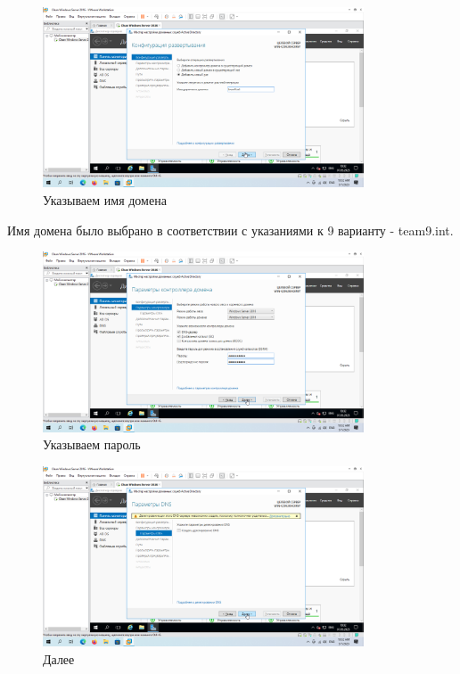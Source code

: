 \documentclass[a4paper]{article}
\begin{document}
  \begin{figure}[H]
    \centering
    \includegraphics[width=0.85\textwidth]{9_0052}
    \caption{Указываем имя домена}
    \label{img:0052}
  \end{figure}

  Имя домена было выбрано в соответствии с указаниями к 9 варианту - team9.int.

  \begin{figure}[H]
    \centering
    \includegraphics[width=0.85\textwidth]{9_0053}
    \caption{Указываем пароль}
    \label{img:0053}
  \end{figure}

  \begin{figure}[H]
    \centering
    \includegraphics[width=0.85\textwidth]{9_0054}
    \caption{Далее}
    \label{img:0054}
  \end{figure}
\end{document}
